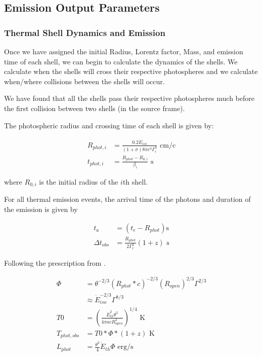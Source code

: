 \documentclass[linenumbers,twocolumn]{aastex631}
\begin{document}
\subsection{Emission Output Parameters}
\subsubsection{Thermal Shell Dynamics and Emission}

Once we have assigned the initial Radius, Lorentz factor, Mass, and emission time of each shell, we can begin to calculate the dynamics of the shells. We calculate when the shells will cross their respective photospheres and we calculate when/where collisions between the shells will occur. 

We have found that all the shells pass their respective photospheres much before the first collision between two shells (in the source frame).

The photospheric radius and crossing time of each shell is given by:

\begin{align}
	R_{phot,i} &= \frac{0.2 \dot{E}_{iso}}{(1+\sigma)8\pi c^4 \Gamma_i^3} \text{ cm/c} \label{eq: phot rad}\\ 
	t_{phot,i} &= \frac{R_{phot} - R_{0,i}}{\beta_i}\text{ s}
\end{align}

where $R_{0,i}$ is the initial radius of the $i$th shell.

For all thermal emission events, the arrival time of the photons and duration of the emission is given by

\begin{align}
	t_a &= (t_e - R_{phot}) \text{s}\\
	\Delta t_{obs} &= \frac{R_{phot}}{2\Gamma_r^2} (1+z) \text{ s}
\end{align}

Following the prescription from \citet{2013A&A...551A.124H}.

\begin{align}
	\Phi &= \theta^{-2/3} (R_{phot}*c)^{-2/3} (R_{open})^{2/3} \Gamma^{2/3}\\
	&\approx \dot{E}_{iso}^{-2/3} \Gamma^{8/3} \\
	T0 &= \left(\frac{\dot{E}_{th}^2 \theta^2}{4\pi a c R_{open}^2} \right)^{1/4} \text{ K} \\ 
	T_{phot,obs} &= T0*\Phi*(1+z) \text{ K} \\
	L_{phot} &= \frac{\theta^2}{4} \dot{E}_{th} \Phi \text{ erg/s}
\end{align}
\end{document}
